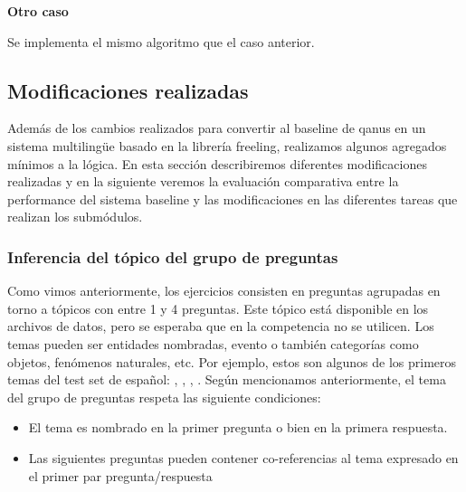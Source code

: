 \textbf{Otro caso} \newline

Se implementa el mismo algoritmo que el caso anterior. \newline


\subsection{Modificaciones realizadas}
\label{subsec:modificaciones}

Además de los cambios realizados para convertir al baseline de qanus en un sistema multilingüe basado en la librería freeling, realizamos algunos agregados mínimos a la lógica. En esta sección describiremos diferentes modificaciones realizadas y en la siguiente veremos la evaluación comparativa entre la performance del sistema baseline y las modificaciones en las diferentes tareas que realizan los submódulos.

\subsubsection{Inferencia del tópico del grupo de preguntas}
\label{subsubsec:entidad-de-grupo}

Como vimos anteriormente, los ejercicios consisten en preguntas agrupadas en torno a tópicos con entre 1 y 4 preguntas. Este tópico está disponible en los archivos de datos, pero se esperaba que en la competencia no se utilicen. Los temas pueden ser entidades nombradas, evento o también categorías como objetos, fenómenos naturales, etc. Por ejemplo, estos son algunos de los primeros temas del test set de español: , , , . Según mencionamos anteriormente, el tema del grupo de preguntas respeta las siguiente condiciones:

\begin{itemize}
\item El tema es nombrado en la primer pregunta o bien en la primera respuesta.
\item Las siguientes preguntas pueden contener co-referencias al tema expresado en el primer par pregunta/respuesta
\end{itemize}

